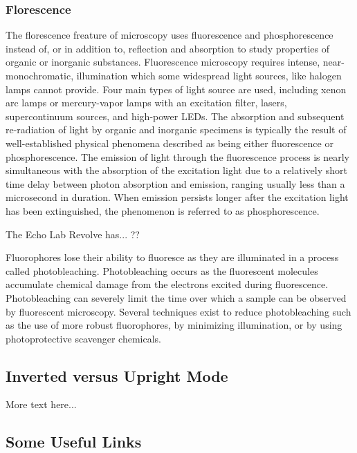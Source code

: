 \documentclass{article}
\begin{document}
\subsubsection{Florescence}

The florescence freature of microscopy uses fluorescence and phosphorescence instead of, or in addition to, reflection and absorption to study properties of organic or inorganic substances. Fluorescence microscopy requires intense, near-monochromatic, illumination which some widespread light sources, like halogen lamps cannot provide. Four main types of light source are used, including xenon arc lamps or mercury-vapor lamps with an excitation filter, lasers, supercontinuum sources, and high-power LEDs. 
The absorption and subsequent re-radiation of light by organic and inorganic specimens is typically the result of well-established physical phenomena described as being either fluorescence or phosphorescence. The emission of light through the fluorescence process is nearly simultaneous with the absorption of the excitation light due to a relatively short time delay between photon absorption and emission, ranging usually less than a microsecond in duration. When emission persists longer after the excitation light has been extinguished, the phenomenon is referred to as phosphorescence.

The Echo Lab Revolve has... ??

Fluorophores lose their ability to fluoresce as they are illuminated in a process called photobleaching. Photobleaching occurs as the fluorescent molecules accumulate chemical damage from the electrons excited during fluorescence. Photobleaching can severely limit the time over which a sample can be observed by fluorescent microscopy. Several techniques exist to reduce photobleaching such as the use of more robust fluorophores, by minimizing illumination, or by using photoprotective scavenger chemicals.

\subsection{Inverted versus Upright Mode}

More text here...

\subsection{Some Useful Links}

\end{document}

